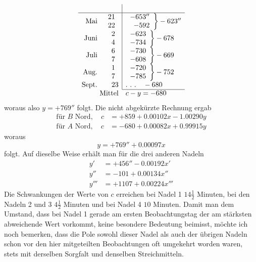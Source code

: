 \[
\begin{array}{rr|l}
&&\\\hline
\text{Mai}&\begin{array}{r}21\\22\end{array}&\left.\begin{array}{r}-653''\\-592\end{array}\right\}-623''\\
\text{Juni}&\begin{array}{r}2\\4\end{array}&\left.\begin{array}{r}-623\\-734\end{array}\right\}-678\\
\text{Juli}&\begin{array}{r}6\\7\end{array}&\left.\begin{array}{r}-730\\-608\end{array}\right\}-669\\
\text{Aug.}&\begin{array}{r}1\\7\end{array}&\left.\begin{array}{r}-720\\-785\end{array}\right\}-752\\
\text{Sept.}&23&.\ .\ .\quad-680\\\cline{3-3}
\multicolumn{2}{r}{\text{Mittel}}&c-y=-680
\end{array}
\]
woraus also $y=+769''$ folgt. Die nicht abgekürzte Rechnung ergab
\[
\begin{aligned}
\text{für }B\text{ Nord},\quad c&=+859+0.00102x-1.00290y\\
\text{für }A\text{ Nord},\quad c&=-680+0.00082x+0.99915y
\end{aligned}
\]
woraus
\[
y=+769''+0.00097x
\]
folgt. Auf dieselbe Weise erhält man für die drei anderen Nadeln
\[
\begin{aligned}
y'&=+456''-0.00192x'\\
y''&=-101+0.00134x''\\
y'''&=+1107+0.00224x'''
\end{aligned}
\]
Die Schwankungen der Werte von $c$ erreichen bei Nadel 1 $14\frac12$ Minuten, bei den Nadeln 2 und 3 $4\frac12$ Minuten und bei Nadel 4 $10$ Minuten. Damit man dem Umstand, dass bei Nadel 1 gerade am ersten Beobachtungstag der am stärksten abweichende Wert vorkommt, keine besondere Bedeutung beimisst, möchte ich noch bemerken, dass die Pole sowohl dieser Nadel als auch der übrigen Nadeln schon vor den hier mitgeteilten Beobachtungen oft umgekehrt worden waren, stets mit derselben Sorgfalt und denselben Streichmitteln.


